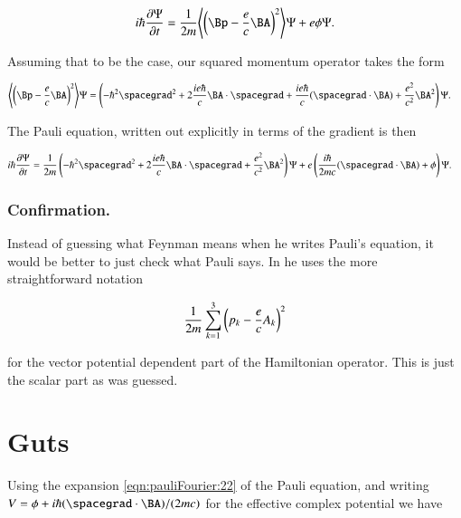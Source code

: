 \begin{align}\label{eqn:pauliFourier:1c}
i \hbar \PD{t}{\Psi} = \inv{2m} \gpgradezero{ \left( \Bp - \frac{e}{c} \BA \right)^2 } \Psi + e \phi \Psi.
\end{align}

Assuming that to be the case, our squared momentum operator takes the form

\begin{align}\label{eqn:pauliFourier:21}
\gpgradezero{ \left( \Bp - \frac{e}{c} \BA \right)^2 } \Psi 
&=
\left( - \hbar^2 \spacegrad^2 + 2 
\frac{i e \hbar }{c}
\BA \cdot \spacegrad 
+ 
\frac{i e \hbar }{c}
(\spacegrad \cdot \BA) 
+ 
\frac{e^2}{c^2} \BA^2 \right) \Psi.
\end{align}

The Pauli equation, written out explicitly in terms of the gradient is then

\begin{align}\label{eqn:pauliFourier:22}
i \hbar \PD{t}{\Psi} 
&= 
\inv{2m} 
\left( - \hbar^2 \spacegrad^2 + 2 
\frac{i e \hbar }{c}
\BA \cdot \spacegrad 
+ 
\frac{e^2}{c^2} \BA^2 \right) \Psi
+
e \left( \frac{i \hbar }{ 2 m c} (\spacegrad \cdot \BA) + \phi \right) \Psi.
\end{align}

\subsubsection{Confirmation.}

Instead of guessing what Feynman means when he writes Pauli's equation, it would be better to just check what Pauli says.  In \citep{pauli2000wm} he uses the more straightforward notation

\begin{align}\label{eqn:pauliFourier:25}
\frac{1}{2m} \sum_{k=1}^3 \left( p_k - \frac{e}{c}A_k \right)^2
\end{align}

for the vector potential dependent part of the Hamiltonian operator.  This is just the scalar part as was guessed.

\section{Guts}

Using the expansion \ref{eqn:pauliFourier:22} of the Pauli equation, and writing $V = \phi + i \hbar (\spacegrad \cdot \BA)/ (2 m c)$ for the effective complex potential we have


